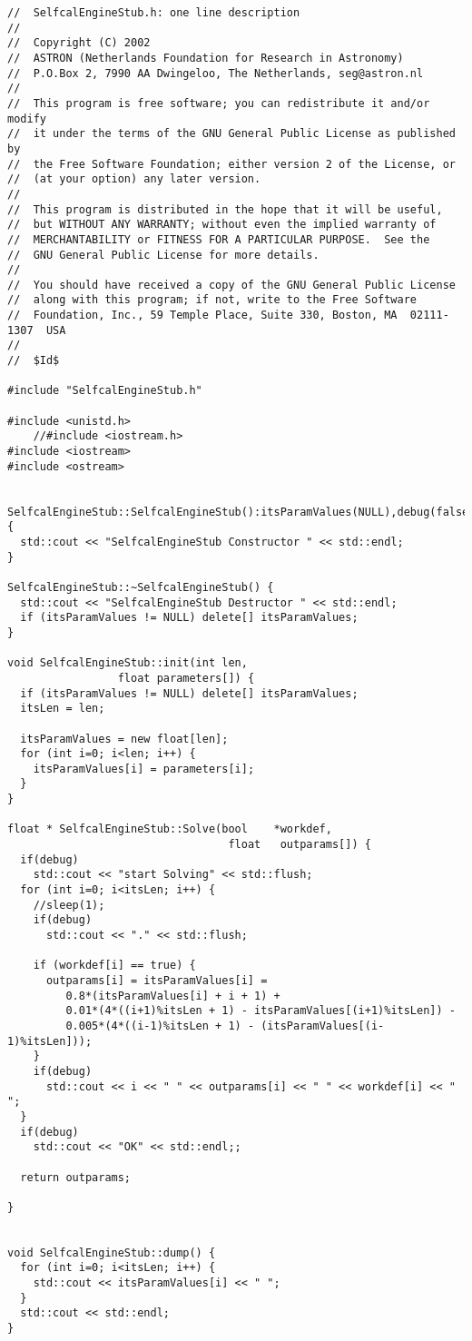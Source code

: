 \documentclass[]{lofar}
\begin{document}
\begin{Verbatim}[]
//  SelfcalEngineStub.h: one line description
//
//  Copyright (C) 2002
//  ASTRON (Netherlands Foundation for Research in Astronomy)
//  P.O.Box 2, 7990 AA Dwingeloo, The Netherlands, seg@astron.nl
//
//  This program is free software; you can redistribute it and/or modify
//  it under the terms of the GNU General Public License as published by
//  the Free Software Foundation; either version 2 of the License, or
//  (at your option) any later version.
//
//  This program is distributed in the hope that it will be useful,
//  but WITHOUT ANY WARRANTY; without even the implied warranty of
//  MERCHANTABILITY or FITNESS FOR A PARTICULAR PURPOSE.  See the
//  GNU General Public License for more details.
//
//  You should have received a copy of the GNU General Public License
//  along with this program; if not, write to the Free Software
//  Foundation, Inc., 59 Temple Place, Suite 330, Boston, MA  02111-1307  USA
//
//  $Id$

#include "SelfcalEngineStub.h"

#include <unistd.h>
    //#include <iostream.h>
#include <iostream>
#include <ostream>


SelfcalEngineStub::SelfcalEngineStub():itsParamValues(NULL),debug(false) {
  std::cout << "SelfcalEngineStub Constructor " << std::endl;
}

SelfcalEngineStub::~SelfcalEngineStub() {
  std::cout << "SelfcalEngineStub Destructor " << std::endl;
  if (itsParamValues != NULL) delete[] itsParamValues;
}

void SelfcalEngineStub::init(int len,
			     float parameters[]) {
  if (itsParamValues != NULL) delete[] itsParamValues;
  itsLen = len;

  itsParamValues = new float[len];
  for (int i=0; i<len; i++) {
    itsParamValues[i] = parameters[i];
  }
}

float * SelfcalEngineStub::Solve(bool    *workdef, 
                                  float   outparams[]) {
  if(debug)
    std::cout << "start Solving" << std::flush;
  for (int i=0; i<itsLen; i++) {
    //sleep(1);
    if(debug)
      std::cout << "." << std::flush;

    if (workdef[i] == true) {
      outparams[i] = itsParamValues[i] =
         0.8*(itsParamValues[i] + i + 1) +
         0.01*(4*((i+1)%itsLen + 1) - itsParamValues[(i+1)%itsLen]) -
         0.005*(4*((i-1)%itsLen + 1) - (itsParamValues[(i-1)%itsLen]));
    }
    if(debug)
      std::cout << i << " " << outparams[i] << " " << workdef[i] << "  ";
  }
  if(debug)
    std::cout << "OK" << std::endl;;
  
  return outparams;
  
}


void SelfcalEngineStub::dump() {
  for (int i=0; i<itsLen; i++) {
    std::cout << itsParamValues[i] << " ";
  }
  std::cout << std::endl;
}
\end{Verbatim}
\end{document}
